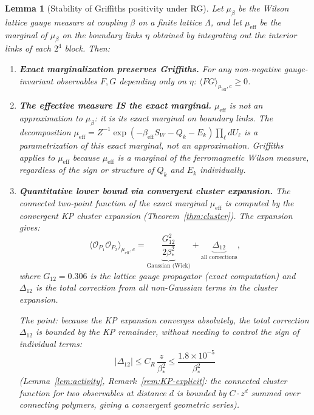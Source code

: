 \documentclass[11pt]{article}
\newtheorem{lemma}[theorem]{Lemma}
\theoremstyle{definition}
\begin{document}
\begin{lemma}[Stability of Griffiths positivity under RG]%
\label{lem:griffiths-stable}
Let $\mu_\beta$ be the Wilson lattice gauge measure at coupling
$\beta$ on a finite lattice $\Lambda$, and let
$\mu_{\mathrm{eff}}$ be the marginal of $\mu_\beta$ on the
boundary links $\eta$ obtained by integrating out the interior
links of each $2^4$ block.  Then:
\begin{enumerate}[nosep,label=\textup{(\roman*)}]
\item \textbf{Exact marginalization preserves Griffiths.}
For any non-negative gauge-invariant observables $F,G$
depending only on $\eta$:
$\langle FG\rangle_{\mu_{\mathrm{eff}},c}\ge 0$.
\item \textbf{The effective measure IS the exact marginal.}
$\mu_{\mathrm{eff}}$ is not an approximation
to $\mu_\beta$: it is its exact marginal on boundary links.
The decomposition
$\mu_{\mathrm{eff}}=Z^{-1}\exp(-\beta_{\mathrm{eff}}S_W
-Q_k-E_k)\prod_\ell dU_\ell$
is a \emph{parametrization} of this exact marginal, not an
approximation.  Griffiths applies to $\mu_{\mathrm{eff}}$
because $\mu_{\mathrm{eff}}$ is a marginal of the ferromagnetic
Wilson measure, regardless of the sign or structure of $Q_k$
and $E_k$ individually.
\item \textbf{Quantitative lower bound via convergent cluster expansion.}
The connected two-point function of the exact marginal
$\mu_{\mathrm{eff}}$ is computed by the convergent
KP cluster expansion (Theorem~\ref{thm:cluster}).
The expansion gives:
\begin{equation}\label{eq:two-pt-cluster}
\langle\mathcal{O}_{P_1}\mathcal{O}_{P_2}
\rangle_{\mu_{\mathrm{eff}},c}
=\underbrace{\frac{G_{12}^2}{2\beta_*^2}}_{\text{Gaussian (Wick)}}
+\underbrace{\Delta_{12}}_{\text{all corrections}},
\end{equation}
where $G_{12}=0.306$ is the lattice gauge propagator
\textup{(}exact computation\textup{)} and
$\Delta_{12}$ is the total correction from
all non-Gaussian terms in the cluster expansion.

The point: because the KP expansion \emph{converges
absolutely}, the total correction $\Delta_{12}$ is
bounded by the KP remainder, without needing to
control the sign of individual terms:
\begin{equation}\label{eq:Delta-bound}
|\Delta_{12}|\le C_R\,\frac{z}{\beta_*^2}
\le\frac{1.8\times 10^{-5}}{\beta_*^2}
\end{equation}
\textup{(}Lemma~\ref{lem:activity},
Remark~\ref{rem:KP-explicit}: the connected cluster
function for two observables at distance $d$ is
bounded by $C\cdot z^d$ summed over connecting
polymers, giving a convergent geometric series\textup{)}.


\end{enumerate}
\end{lemma}
\end{document}
